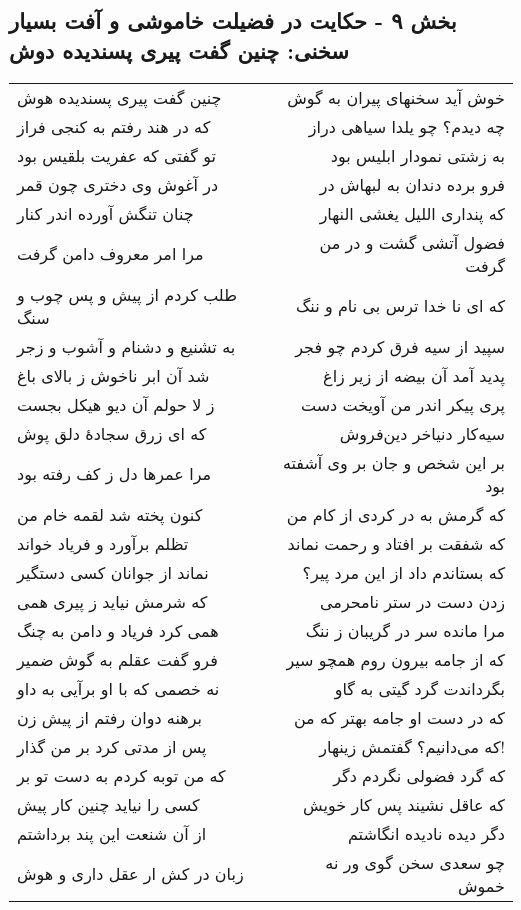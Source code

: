 \begin{center}
\section*{بخش ۹ - حکایت در فضیلت خاموشی و آفت بسیار سخنی: چنین گفت پیری پسندیده دوش}
\label{sec:009}
\begin{longtable}{l p{0.5cm} r}
چنین گفت پیری پسندیده هوش
&&
خوش آید سخنهای پیران به گوش
\\
که در هند رفتم به کنجی فراز
&&
چه دیدم؟ چو یلدا سیاهی دراز
\\
تو گفتی که عفریت بلقیس بود
&&
به زشتی نمودار ابلیس بود
\\
در آغوش وی دختری چون قمر
&&
فرو برده دندان به لبهاش در
\\
چنان تنگش آورده اندر کنار
&&
که پنداری اللیل یغشی النهار
\\
مرا امر معروف دامن گرفت
&&
فضول آتشی گشت و در من گرفت
\\
طلب کردم از پیش و پس چوب و سنگ
&&
که ای نا خدا ترس بی نام و ننگ
\\
به تشنیع و دشنام و آشوب و زجر
&&
سپید از سیه فرق کردم چو فجر
\\
شد آن ابر ناخوش ز بالای باغ
&&
پدید آمد آن بیضه از زیر زاغ
\\
ز لا حولم آن دیو هیکل بجست
&&
پری پیکر اندر من آویخت دست
\\
که ای زرق سجادهٔ دلق پوش
&&
سیه‌کار دنیاخر دین‌فروش
\\
مرا عمرها دل ز کف رفته بود
&&
بر این شخص و جان بر وی آشفته بود
\\
کنون پخته شد لقمه خام من
&&
که گرمش به در کردی از کام من
\\
تظلم برآورد و فریاد خواند
&&
که شفقت بر افتاد و رحمت نماند
\\
نماند از جوانان کسی دستگیر
&&
که بستاندم داد از این مرد پیر؟
\\
که شرمش نیاید ز پیری همی
&&
زدن دست در ستر نامحرمی
\\
همی کرد فریاد و دامن به چنگ
&&
مرا مانده سر در گریبان ز ننگ
\\
فرو گفت عقلم به گوش ضمیر
&&
که از جامه بیرون روم همچو سیر
\\
نه خصمی که با او برآیی به داو
&&
بگرداندت گرد گیتی به گاو
\\
برهنه دوان رفتم از پیش زن
&&
که در دست او جامه بهتر که من
\\
پس از مدتی کرد بر من گذار
&&
که می‌دانیم؟ گفتمش زینهار!
\\
که من توبه کردم به دست تو بر
&&
که گرد فضولی نگردم دگر
\\
کسی را نیاید چنین کار پیش
&&
که عاقل نشیند پس کار خویش
\\
از آن شنعت این پند برداشتم
&&
دگر دیده نادیده انگاشتم
\\
زبان در کش ار عقل داری و هوش
&&
چو سعدی سخن گوی ور نه خموش
\\
\end{longtable}
\end{center}
